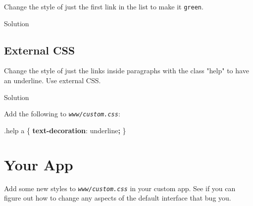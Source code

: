 \documentclass[
  oneside]{book}
\newenvironment{Shaded}{\begin{snugshade}}{\end{snugshade}}
\newcommand{\AttributeTok}[1]{\textcolor[rgb]{0.77,0.63,0.00}{#1}}
\newcommand{\DecValTok}[1]{\textcolor[rgb]{0.00,0.00,0.81}{#1}}
\newcommand{\FunctionTok}[1]{\textcolor[rgb]{0.00,0.00,0.00}{#1}}
\newcommand{\KeywordTok}[1]{\textcolor[rgb]{0.13,0.29,0.53}{\textbf{#1}}}
\newcommand{\NormalTok}[1]{#1}
\newcommand{\OperatorTok}[1]{\textcolor[rgb]{0.81,0.36,0.00}{\textbf{#1}}}
\newcommand{\SpecialCharTok}[1]{\textcolor[rgb]{0.00,0.00,0.00}{#1}}
\newcommand{\StringTok}[1]{\textcolor[rgb]{0.31,0.60,0.02}{#1}}
\begin{document}
Change the style of just the first link in the list to make it \texttt{green}.

Solution

\begin{Shaded}
\end{Shaded}

\hypertarget{external-css-1}{%
\subsection*{External CSS}\label{external-css-1}}

Change the style of just the links inside paragraphs with the \AttributeTok{class} \StringTok{"help"} to have an underline. Use external CSS.

Solution

Add the following to \textit{\texttt{www/custom.css}}:

\begin{Shaded}
\begin{Highlighting}[]
\FunctionTok{.help}\NormalTok{ a \{ }\KeywordTok{text{-}decoration}\NormalTok{: }\DecValTok{underline}\OperatorTok{;}\NormalTok{ \}}
\end{Highlighting}
\end{Shaded}

\hypertarget{your-app-web}{%
\section{Your App}\label{your-app-web}}

Add some new styles to \textit{\texttt{www/custom.css}} in your custom app. See if you can figure out how to change any aspects of the default interface that bug you.
\end{document}
